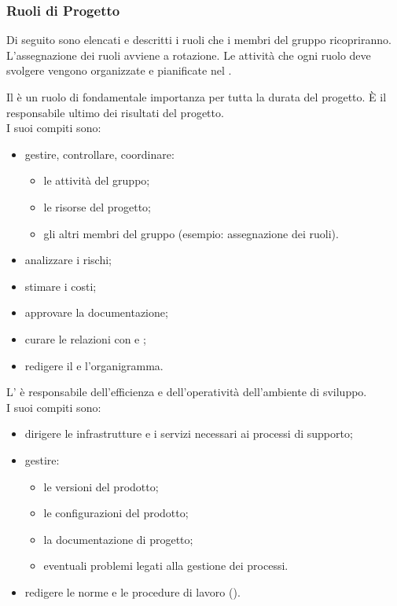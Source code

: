 \subsubsection{Ruoli di Progetto}
Di seguito sono elencati e descritti i ruoli che i membri del gruppo ricopriranno. L'assegnazione dei ruoli avviene a rotazione. Le attività che ogni ruolo deve svolgere vengono organizzate e pianificate nel \PdP{}. 

Il \respProg{} è un ruolo di fondamentale importanza per tutta la durata del progetto. È il responsabile ultimo dei risultati del progetto.\\I suoi compiti sono:
\begin{itemize}
\item gestire, controllare, coordinare:
\begin{itemize}
\item le attività del gruppo;
\item le risorse del progetto;
\item gli altri membri del gruppo (esempio: assegnazione dei ruoli).
\end{itemize}
\item analizzare i rischi;
\item stimare i costi;
\item approvare la documentazione;
\item curare le relazioni con \proponProg{} e \commitProg{};
\item redigere il \PdP{} e l'organigramma.
\end{itemize} 

L'\ammProg{} è responsabile dell'efficienza e dell'operatività dell'ambiente di sviluppo.\\I suoi compiti sono: 
\begin{itemize}
\item dirigere le infrastrutture e i servizi necessari ai processi di supporto; 
\item gestire:
\begin{itemize}
\item le versioni del prodotto;
\item le configurazioni del prodotto;
\item la documentazione di progetto;
\item eventuali problemi legati alla gestione dei processi.
\end{itemize} 
\item redigere le norme e le procedure di lavoro (\NdP{}).
\end{itemize}

